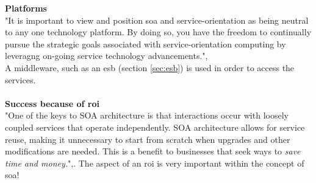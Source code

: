 \documentclass[12pt]{article}
\begin{document}
	\FloatBarrier
\noindent
\textbf{Platforms}\\
"It is important to view and position \gls{soa} and service-orientation as being neutral to any one technology platform. By doing so, you have the freedom to continually pursue the strategic goals associated with service-orientation computing by leveragng on-going service technology advancements.",\cite[page 29]{grau} \\ A middleware, such as an \gls{esb} (section \ref{sec:esb}) is used in order to access the services.
\\ \\
\textbf{Success because of \gls{roi}}\\
"One of the keys to SOA architecture is that interactions occur with loosely coupled services that operate independently. SOA architecture allows for service reuse, making it unnecessary to start from scratch when upgrades and other modifications are needed. This is a benefit to businesses that seek ways to \textit{save time and money.}",\cite{searchsoa}. The aspect of an \gls{roi} is very important within the concept of \gls{soa}!
\end{document}
